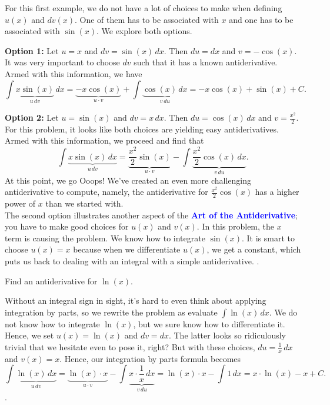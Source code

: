 \solution For this first example, we do not have a lot of choices to make when defining  $u(x)$ and $dv(x)$. One of them has to be associated with $x$ and one has to be associated with $\sin(x)$. We explore both options.

\textbf{Option 1:} Let \( u = x \) and \( dv = \sin(x) \, dx \).  Then \( du = dx \) and \( v = -\cos(x) \). It was very important to choose $dv$ such that it has a known antiderivative. Armed with this information, we have 
\[ \int \underbrace{x \sin(x)}_{ u\, dv} \, dx = \underbrace{-x \cos(x)}_{u \cdot v} + \int \underbrace{\cos(x) \, dx}_{v \, du} = -x \cos(x) + \sin(x) + C. \]

\textbf{Option 2:} Let \( u = \sin(x) \) and \( dv = x \, dx \).  Then \( du = \cos(x)\, dx \) and \( v = \frac{x^2}{2} \). For this problem, it looks like both choices are yielding easy antiderivatives. Armed with this information, we proceed and find that 
\[ \int \underbrace{x \sin(x)  \, dx}_{u\, dv} = \underbrace{\frac{x^2}{2}\sin(x)}_{u \cdot v} - \int \underbrace{\frac{x^2}{2} \cos(x) \, dx}_{v \, du} .\]
At this point, we go Ooops! We've created an even more challenging antiderivative to compute, namely, the antiderivative for $\frac{x^2}{2} \cos(x)$ has a higher power of $x$ than we started with. \\

The second option illustrates another aspect of the \textcolor{blue}{\bf Art of the Antiderivative}; you have to make good choices for $u(x)$ and $v(x)$. In this problem, the $x$ term is causing the problem. We know how to integrate $\sin(x)$. It is smart to choose $u(x) = x$ because when we differentiate $u(x)$, we get a constant, which puts us back to dealing with an integral with a simple antiderivative. 
\Qed. 

\bigskip



\begin{example} Find an antiderivative for $\ln(x)$.    
\end{example}

\solution Without an integral sign in sight, it's hard to even think about applying integration by parts, so we rewrite the problem as evaluate $\int \ln(x)\, dx$. We do not know how to integrate $\ln(x)$, but we sure know how to differentiate it. Hence, we set $u(x) = \ln(x)$ and $dv = dx$. The latter looks so ridiculously trivial that we hesitate even to pose it, right? But with these choices, $du = \frac{1}{x} \, dx$ and $v(x) = x$. Hence, our integration by parts formula becomes
$$\int  \underbrace{\ln(x) \, dx}_{u \, dv} = \underbrace{\ln(x) \cdot x}_{u \cdot v} - \int \underbrace{x \cdot \frac{1}{x} \, dx}_{v \, du} =  \ln(x) \cdot x - \int 1\, dx = x \cdot \ln(x) - x + C. $$
\Qed. 

